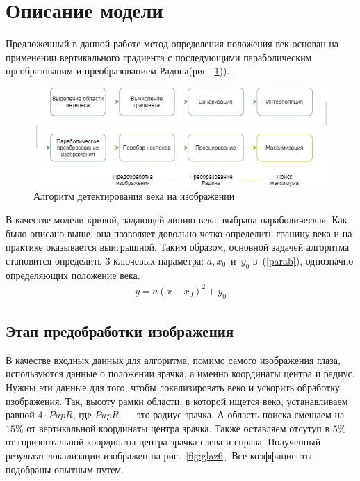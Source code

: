\documentclass[12pt]{article} %
\begin{document}
\newpage




\newpage
\section{Описание модели}

 Предложенный в данной работе метод определения положения век основан на применении вертикального градиента с последующими параболическим преобразованим и преобразованием Радона(рис.~\ref{fig:map})).

\begin{figure}[h]
	
	\centering
	
	\includegraphics[width=0.8\linewidth]{map.jpg}
	
	\caption{Алгоритм детектирования века на изображении}
	
	\label{fig:map}
	
\end{figure}

В качестве модели кривой, задающей линию века, выбрана параболическая. Как было описано выше, она позволяет довольно четко определить границу века и на практике оказывается выигрышной. Таким образом, основной задачей алгоритма становится определить 3 ключевых параметра: $a, x_0$~и~$y_0$ в~(\ref{parab}), однозначно определяющих положение века.
\begin{gather}\label{parab}
	y = a(x-x_0)^2 + y_0
\end{gather}

\subsection{Этап предобработки изображения}

В качестве входных данных для алгоритма, помимо самого изображения глаза, используются данные о положении зрачка, а именно координаты центра и радиус. Нужны эти данные для того, чтобы локализировать веко и ускорить обработку изображения. Так, высоту рамки области, в которой ищется веко, устанавливаем равной $4\cdot PupR$, где $PupR$~--- это радиус зрачка. А область поиска смещаем на $15\%$ от вертикальной координаты центра зрачка. Также оставляем отсутуп в $5\%$ от горизонтальной координаты центра зрачка слева и справа. Полученный результат локализации изображен на рис.~\ref{fig:glaz6}. Все коэффициенты подобраны опытным путем.
\end{document}
